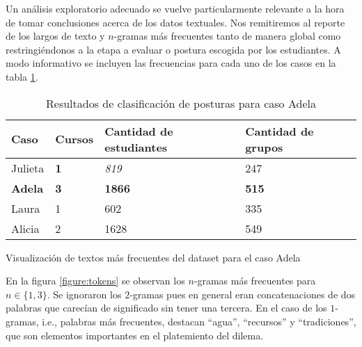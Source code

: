 \documentclass[
	spanish, %
	letterpaper, oneside
]{article}
\begin{document}
Un análisis exploratorio adecuado se vuelve particularmente relevante a la hora de tomar conclusiones acerca de los datos textuales. Nos remitiremos al reporte de los largos de texto y $n$-gramas más frecuentes tanto de manera global como restringiéndonos a la etapa a evaluar o postura escogida por los estudiantes. A modo informativo se incluyen las frecuencias para cada uno de los casos en la tabla \ref{tab:freqs_casos}.

\begin{table}[htbp]
\centering
\caption{Resultados de clasificación de posturas para caso Adela}
\begin{tabular}{|l|l|l|l|}
\hline
\textbf{Caso}  & \textbf{Cursos} & \textbf{Cantidad de estudiantes} & \textbf{Cantidad de grupos} \\ \hline
Julieta        & \textbf{1}      & \textit{819}                     & 247                         \\ \hline
\textbf{Adela} & \textbf{3}      & \textbf{1866}                    & \textbf{515}                \\ \hline
Laura          & 1               & 602                              & 335                         \\ \hline
Alicia         & 2               & 1628                             & 549                         \\ \hline
\end{tabular}
\label{tab:freqs_casos}
\end{table}

\begin{images}[\label{figure:tokens}]{Visualización de textos más frecuentes del dataset para el caso Adela}
    \imagesnewline
\end{images}

En la figura \ref{figure:tokens} se observan los $n$-gramas más frecuentes para $n \in \{ 1, 3 \}$. Se ignoraron los $2$-gramas pues en general eran concatenaciones de dos palabras que carecían de significado sin tener una tercera. En el caso de los $1$-gramas, i.e., palabras más frecuentes, destacan ``agua'', ``recursos'' y ``tradiciones'', que son elementos importantes en el platemiento del dilema.
\end{document}
